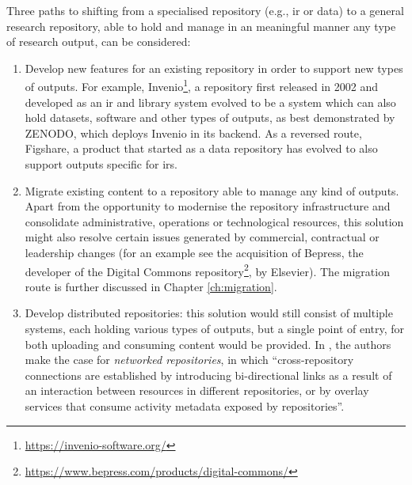 Three paths to shifting from a specialised repository (e.g., \gls{ir} or data) to a general research repository, able to hold and manage in an meaningful manner any type of research output, can be considered: 
\begin{enumerate}
    \item Develop new features for an existing repository in order to support new types of outputs. For example, Invenio\footnote{\url{https://invenio-software.org/}}, a repository first released in 2002 and developed as an \gls{ir} and library system evolved to be a system which can also hold datasets\cite{invenioabout}, software and other types of outputs, as best demonstrated by ZENODO, which deploys Invenio in its backend. As a reversed route, Figshare, a product that started as a data repository has evolved to also support outputs specific for \glspl{ir}\cite{figntro}.
    \item Migrate existing content to a repository able to manage any kind of outputs. Apart from the opportunity to modernise the repository infrastructure and consolidate administrative, operations or technological resources, this solution might also resolve certain issues generated by commercial, contractual or leadership changes (for an example see the acquisition of Bepress, the developer of the Digital Commons repository\footnote{\url{https://www.bepress.com/products/digital-commons/}}, by Elsevier\cite{bels}). The migration route is further discussed in Chapter \ref{ch:migration}.
    \item Develop distributed repositories: this solution would still consist of multiple systems, each holding various types of outputs, but a single point of entry, for both uploading and consuming content would be provided. In \cite{coar}, the authors make the case for \emph{networked repositories}, in which \emph{}``cross-repository connections are established by introducing bi-directional links as a result of an interaction between resources in different repositories, or by overlay services that consume activity metadata exposed by repositories''. 
\end{enumerate}

